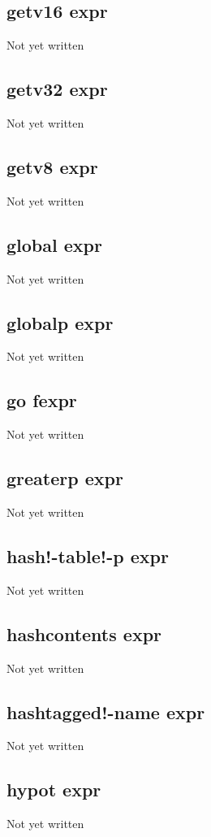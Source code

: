 \documentclass[a4paper,11pt]{article}
\begin{document}
\subsection{\ttfamily getv16 expr}
Not yet written

\subsection{\ttfamily getv32 expr}
Not yet written

\subsection{\ttfamily getv8 expr}
Not yet written

\subsection{\ttfamily global expr}
Not yet written

\subsection{\ttfamily globalp expr}
Not yet written

\subsection{\ttfamily go fexpr}
Not yet written

\subsection{\ttfamily greaterp expr}
Not yet written

\subsection{\ttfamily hash!-table!-p expr}
Not yet written

\subsection{\ttfamily hashcontents expr}
Not yet written

\subsection{\ttfamily hashtagged!-name expr}
Not yet written

\subsection{\ttfamily hypot expr}
Not yet written
\end{document}
